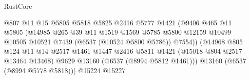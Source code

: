\begin{lexlean}{RustCore}
\begin{coremodule}
                                              @807
                                              @11
                                              @15
                                              @5805
                                              @5818
                                              @5825
                                              @2416
                                              @5777
                                              @1421
                                              (@9406
                                                @465
                                                @11
                                                @5805
                                                (@14985
                                                  @265
                                                  @39
                                                  @11
                                                  @1519
                                                  @1569
                                                  @5785
                                                  @5800
                                                  @12159
                                                  @10499
                                                  @10505
                                                  @10521
                                                  @7439
                                                  (@6537 (@10524 @5800 @5786))
                                                  @7554))
                                              (@14968
                                                @805
                                                @124
                                                @11
                                                @14
                                                @2517
                                                @1461
                                                @1447
                                                @2416
                                                @5811
                                                @1421
                                                (@15018 @804 @2517 @13464 @13468)
                                                @9629
                                                @13160
                                                (@6537 (@8994 @5812 @1461)))
                                              @13160
                                              (@6537 (@8994 @5778 @5818)))
                                            @15224
                                            @15227

\end{coremodule}
\end{lexlean}
